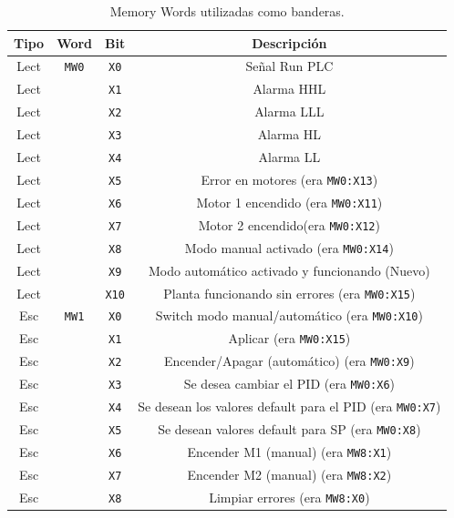 \begin{table}[!t]
\renewcommand{\arraystretch}{1.3}
\centering
\begin{tabular}{c||c||c||c}
\hline
\bfseries Tipo & \bfseries Word & \bfseries Bit & \bfseries Descripción\\
\hline \hline
Lect & \verb|MW0| & \verb|X0| & Señal Run PLC\\
Lect & & \verb|X1| & Alarma HHL\\
Lect & & \verb|X2|& Alarma LLL\\
Lect & & \verb|X3|& Alarma HL\\
Lect & & \verb|X4|& Alarma LL\\
Lect & & \verb|X5|& Error en motores (era \verb|MW0:X13|)\\
Lect & & \verb|X6|& Motor 1 encendido (era \verb|MW0:X11|)\\
Lect & & \verb|X7|& Motor 2 encendido(era \verb|MW0:X12|)\\
Lect & & \verb|X8|& Modo manual activado (era \verb|MW0:X14|)\\
Lect & & \verb|X9|& Modo automático activado y funcionando (Nuevo)\\
Lect & & \verb|X10|& Planta funcionando sin errores (era \verb|MW0:X15|)\\
\hline
Esc & \verb|MW1| & \verb|X0|& Switch modo manual/automático (era 
\verb|MW0:X10|)\\
Esc & & \verb|X1|& Aplicar (era \verb|MW0:X15|)\\
Esc & & \verb|X2|& Encender/Apagar (automático) (era \verb|MW0:X9|)\\
Esc & & \verb|X3|& Se desea cambiar el PID (era \verb|MW0:X6|)\\
Esc & & \verb|X4|& Se desean los valores default para el PID (era
\verb|MW0:X7|)\\
Esc & & \verb|X5|& Se desean valores default para SP (era \verb|MW0:X8|)\\
Esc & & \verb|X6|& Encender M1 (manual) (era \verb|MW8:X1|)\\
Esc & & \verb|X7|& Encender M2 (manual) (era \verb|MW8:X2|)\\
Esc & & \verb|X8|& Limpiar errores (era \verb|MW8:X0|)\\
\hline
\end{tabular}
\caption{Memory Words utilizadas como banderas.}
\label{table:mwBanderas}
\end{table}

